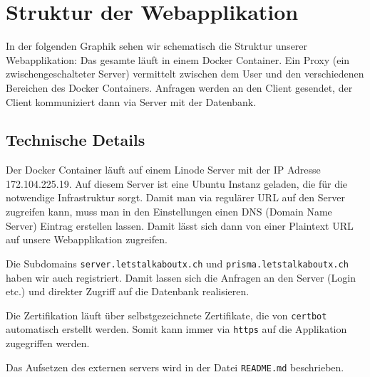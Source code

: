 \section{Struktur der Webapplikation}

In der folgenden Graphik sehen wir schematisch die Struktur unserer Webapplikation: Das gesamte läuft in einem Docker Container. Ein Proxy (ein zwischengeschalteter Server) vermittelt zwischen dem User und den verschiedenen Bereichen des Docker Containers. Anfragen werden an den Client gesendet, der Client kommuniziert dann via Server mit der Datenbank.


\subsection{Technische Details}

Der Docker Container läuft auf einem Linode Server mit der IP Adresse 172.104.225.19. Auf diesem Server ist eine Ubuntu Instanz geladen, die für die notwendige Infrastruktur sorgt. Damit man via regulärer URL auf den Server zugreifen kann, muss man in den Einstellungen einen DNS (Domain Name Server) Eintrag erstellen lassen. Damit lässt sich dann von einer Plaintext URL auf unsere Webapplikation zugreifen. 

Die Subdomains \verb|server.letstalkaboutx.ch| und \verb|prisma.letstalkaboutx.ch| haben wir auch registriert. Damit lassen sich die Anfragen an den Server (Login etc.) und direkter Zugriff auf die Datenbank realisieren.

Die Zertifikation läuft über selbstgezeichnete Zertifikate, die von \verb|certbot| automatisch erstellt werden. Somit kann immer via \verb|https| auf die Applikation zugegriffen werden.

Das Aufsetzen des externen servers wird in der Datei \verb|README.md| beschrieben.









